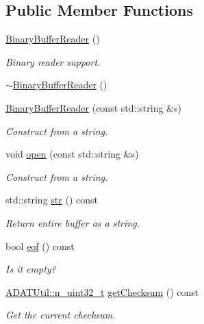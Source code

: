 \subsection*{Public Member Functions}
\begin{DoxyCompactItemize}
\item 
\mbox{\hyperlink{classADATIO_1_1BinaryBufferReader_a9bb5e29231fc81acbe7f0e6ab2720f6c}{Binary\+Buffer\+Reader}} ()
\begin{DoxyCompactList}\small\item\em Binary reader support. \end{DoxyCompactList}\item 
\mbox{\hyperlink{classADATIO_1_1BinaryBufferReader_ab890177a0ac7f1e191ebd15d148fc48b}{$\sim$\+Binary\+Buffer\+Reader}} ()
\item 
\mbox{\hyperlink{classADATIO_1_1BinaryBufferReader_af3ef435054f2f29a596ca4b45b3642e5}{Binary\+Buffer\+Reader}} (const std\+::string \&s)
\begin{DoxyCompactList}\small\item\em Construct from a string. \end{DoxyCompactList}\item 
void \mbox{\hyperlink{classADATIO_1_1BinaryBufferReader_af56c8d00474a1f38f38267c45aa7b433}{open}} (const std\+::string \&s)
\begin{DoxyCompactList}\small\item\em Construct from a string. \end{DoxyCompactList}\item 
std\+::string \mbox{\hyperlink{classADATIO_1_1BinaryBufferReader_a1e960fee8100fbe85f706b45870d95e1}{str}} () const
\begin{DoxyCompactList}\small\item\em Return entire buffer as a string. \end{DoxyCompactList}\item 
bool \mbox{\hyperlink{classADATIO_1_1BinaryBufferReader_ad7957f285235c272d8874d1ab5ffea75}{eof}} () const
\begin{DoxyCompactList}\small\item\em Is it empty? \end{DoxyCompactList}\item 
\mbox{\hyperlink{namespaceADATUtil_ad945a8afa4db2d1f89b731964adae97e}{A\+D\+A\+T\+Util\+::n\+\_\+uint32\+\_\+t}} \mbox{\hyperlink{classADATIO_1_1BinaryBufferReader_ae8e6c22be76223f5e2ce2613e70be4bf}{get\+Checksum}} () const
\begin{DoxyCompactList}\small\item\em Get the current checksum. \end{DoxyCompactList}\item 

\end{DoxyCompactItemize}
